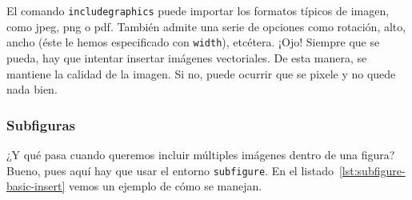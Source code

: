 El comando \texttt{includegraphics} puede importar los formatos típicos de imagen, como jpeg, png o pdf. También admite una serie de opciones como rotación, alto, ancho (éste le hemos especificado con \texttt{width}), etcétera. ¡Ojo! Siempre que se pueda, hay que intentar insertar imágenes vectoriales. De esta manera, se mantiene la calidad de la imagen. Si no, puede ocurrir que se pixele y no quede nada bien.

\subsubsection{Subfiguras}

¿Y qué pasa cuando queremos incluir múltiples imágenes dentro de una figura? Bueno, pues aquí hay que usar el entorno \texttt{subfigure}. En el listado~\ref{lst:subfigure-basic-insert} vemos un ejemplo de cómo se manejan.

